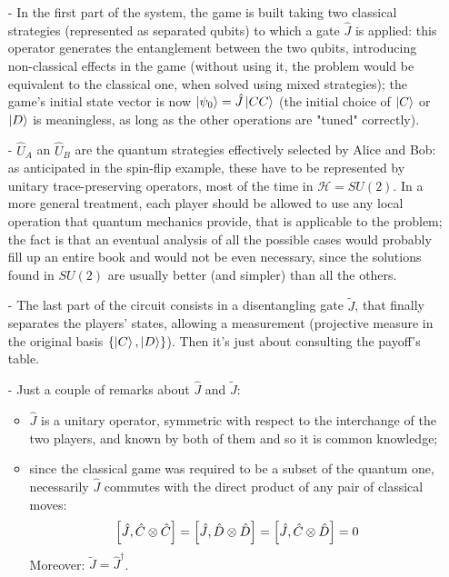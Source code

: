 \begin{itemize}[noitemsep]
	\item[-] In the first part of the system, the game is built taking two classical strategies (represented as separated qubits) to which a gate $\hat{J}$ is applied: this operator generates the entanglement between the two qubits, introducing non-classical effects in the game (without using it, the problem would be equivalent to the classical one, when solved using mixed strategies); the game's initial state vector is now $\ket{\psi_0} = \hat{J}\ket{CC}$ (the initial choice of $\ket{C}$ or $\ket{D}$ is meaningless, as long as the other operations are "tuned" correctly).
	\item[-] $\hat{U}_A$ an $\hat{U}_B$ are the quantum strategies effectively selected by Alice and Bob: as anticipated in the spin-flip example, these have to be represented by unitary trace-preserving operators, most of the time in $\mathcal{H}=SU(2)$. In a more general treatment, each player should be allowed to use any local operation that quantum mechanics provide, that is applicable to the problem; the fact is that an eventual analysis of all the possible cases would probably fill up an entire book and would not be even necessary, since the solutions found in $SU(2)$ are usually better (and simpler) than all the others.
	\item[-] The last part of the circuit consists in a disentangling gate $\tilde{J}$, that finally separates the players' states, allowing a measurement (projective measure in the original basis $\{\ket{C},\ket{D}\}$). Then it's just about consulting the payoff's table.
	\item[-] Just a couple of remarks about $\hat{J}$ and $\tilde{J}$:
	\begin{itemize}
		\item $\hat{J}$ is a unitary operator, symmetric with respect to the interchange of the two players, and known by both of them and so it is common knowledge;
		\item since the classical game was required to be a subset of the quantum one, necessarily $\hat{J}$ commutes with the direct product of any pair of
classical moves:
		\[ \comm{\hat{J}}{\hat{C}\otimes\hat{C}} = \comm{\hat{J}}{\hat{D}\otimes\hat{D}} = \comm{\hat{J}}{\hat{C}\otimes\hat{D}} = 0 \]
		Moreover: $\tilde{J} = \hat{J}^\dagger$.	
	\end{itemize}
\end{itemize}



